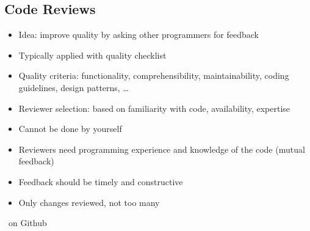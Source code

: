 \subsection{Code Reviews} %
\begin{frame}{\insertsubsection}
	\begin{fancycolumns}
		\begin{definition}{}
			\begin{itemize}
				\item Idea: improve quality by asking other programmers for feedback
				\item Typically applied with quality checklist
				\item Quality criteria: functionality, comprehensibility, maintainability, coding guidelines, design patterns, \ldots
				\item Reviewer selection: based on familiarity with code, availability, expertise
			\end{itemize}
		\end{definition}
		\nextcolumn
		\begin{note}{}
			\begin{itemize}
				\item Cannot be done by yourself
				\item Reviewers need programming experience and knowledge of the code (mutual feedback)
				\item Feedback should be timely and constructive
				\item Only changes reviewed, not too many
			\end{itemize}
		\end{note}
		\hfill
	\end{fancycolumns}
\end{frame}

\begin{frame}{\insertsubsection\ on Github}
\end{frame}
